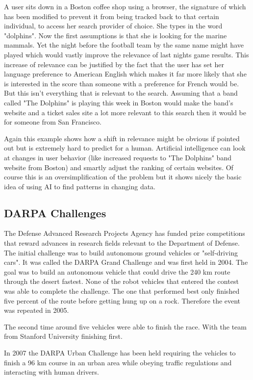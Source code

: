 A user sits down in a Boston coffee shop using a browser, the signature of which has been modified to prevent it from being tracked back to that certain individual, to access her search provider of choice. She types in the word "dolphins". Now the first assumptions is that she is looking for the marine mammals. Yet the night before the football team by the same name might have played which would vastly improve the relevance of last nights game results. This increase of relevance can be justified by the fact that the user has set her language preference to American English which makes it far more likely that she is interested in the score than someone with a preference for French would be. But this isn't everything that is relevant to the search. Assuming that a band called "The Dolphins" is playing this week in Boston would make the band's website and a ticket sales site a lot more relevant to this search then it would be for someone from San Francisco.

Again this example shows how a shift in relevance might be obvious if pointed out but is extremely hard to predict for a human. Artificial intelligence can look at changes in user behavior (like increased requests to "The Dolphins" band website from Boston) and smartly adjust the ranking of certain websites. Of course this is an oversimplification of the problem but it shows nicely the basic idea of using AI to find patterns in changing data.

\subsection{DARPA Challenges}

The Defense Advanced Research Projects Agency has funded prize competitions that reward advances in research fields relevant to the Department of Defense. The initial challenge was to build autonomous ground vehicles or "self-driving cars". It was called the DARPA Grand Challenge and was first held in 2004. The goal was to build an autonomous vehicle that could drive the 240 km route through the desert fastest. None of the robot vehicles that entered the contest was able to complete the challenge. The one that performed best only finished five percent of the route before getting hung up on a rock. Therefore the event was repeated in 2005.

The second time around five vehicles were able to finish the race. With the team from Stanford University finishing first. 

In 2007 the DARPA Urban Challenge has been held requiring the vehicles to finish a 96 km course in an urban area while obeying traffic regulations and interacting with human drivers.


